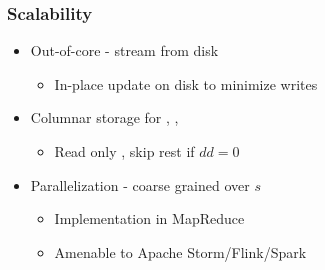 \begin{frame}
  \frametitle{Scalability}

  \begin{itemize}
    \item Out-of-core - stream \spdag from disk
      \begin{itemize}
        \item In-place update on disk to minimize writes
      \end{itemize}
    \item Columnar storage for \dist, \paths, \dep
      \begin{itemize}
        \item Read only \dist, skip rest if $dd=0$
      \end{itemize}
    \item Parallelization - coarse grained over $s$
      \begin{itemize}
        \item Implementation in MapReduce
        \item Amenable to Apache Storm/Flink/Spark
      \end{itemize}
  \end{itemize}

\end{frame}


